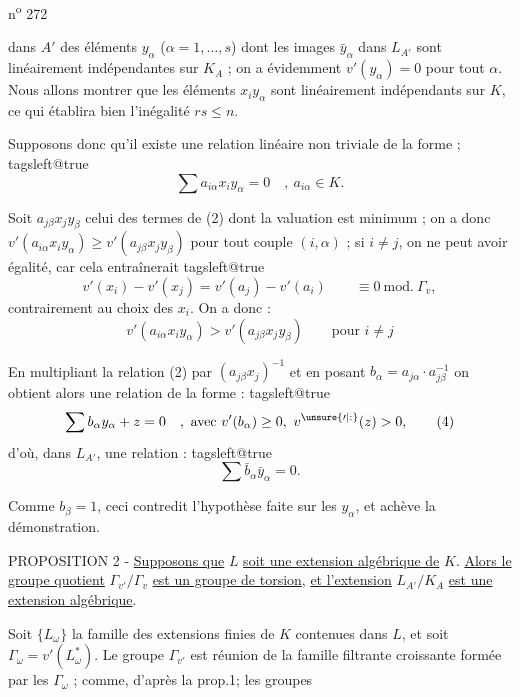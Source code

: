 n\textsuperscript{o} 272

dans $A'$ des éléments $y_\alpha$ ($\alpha=1,\ldots,s$) dont les images $\bar y_\alpha$ dans $L_{A'}$ sont linéairement indépendantes sur $K_A$ ; on a évidemment $v'(y_\alpha)=0$ pour tout $\alpha$. Nous allons montrer que les éléments $x_i y_\alpha$ sont linéairement indépendants sur $K$, ce qui établira bien l'inégalité $rs\leq n$.

Supposons donc qu'il existe une relation linéaire non triviale de la forme ;
\begingroup\csname tagsleft@true\endcsname
\[
\sum a_{i\alpha}x_i y_\alpha=0\quad,\ a_{i\alpha}\in K. \tag*{(2)}
\]
\endgroup

Soit $a_{j\beta}x_j y_\beta$ celui des termes de (2) dont la valuation est minimum ; on a donc $v'(a_{i\alpha}x_i y_\alpha)\geq v'(a_{j\beta}x_j y_\beta)$ pour tout couple $(i,\alpha)$ ; si $i\ne j$, on ne peut avoir égalité, car cela entraînerait
\begingroup\csname tagsleft@true\endcsname
\[
v'(x_i)-v'(x_j)=v'(a_j)-v'(a_i)\qquad\equiv 0\ \mathrm{mod.}\ \Gamma_v, \tag*{(3)}
\]
\endgroup
contrairement au choix des $x_i$. On a donc :
\[
v'(a_{i\alpha}x_i y_\alpha)>v'(a_{j\beta}x_j y_\beta)\qquad\text{pour } i\ne j
\]

En multipliant la relation (2) par $(a_{j\beta}x_j)^{-1}$ et en posant $b_\alpha=a_{j\alpha}\cdot a_{j\beta}^{-1}$ on obtient alors une relation de la forme :
\begingroup\csname tagsleft@true\endcsname
\[
\sum b_\alpha y_\alpha+z=0\quad,\ \text{avec }v'(b_\alpha)\geq 0,\ v^{\unsure{\prime|:}}(z)>0, \tag*{(4)}
\]
\endgroup
d'où, dans $L_{A'}$, une relation :
\begingroup\csname tagsleft@true\endcsname
\[
\sum\bar b_\alpha\bar y_\alpha=0. \tag*{(5)}
\]
\endgroup

Comme $b_\beta=1$, ceci contredit l'hypothèse faite sur les $y_\alpha$, et achève la démonstration.

PROPOSITION 2 - \uline{Supposons que} $L$ \uline{soit une extension algébrique de} $K$. \uline{Alors le groupe quotient} $\Gamma_{v'}/\Gamma_v$ \uline{est un groupe de torsion}, \uline{et l'extension} $L_{A'}/K_A$ \uline{est une extension algébrique}.

Soit $\{L_\omega\}$ la famille des extensions finies de $K$ contenues dans $L$, et soit $\Gamma_\omega=v'(L_\omega^*)$. Le groupe $\Gamma_{v'}$ est réunion de la famille filtrante croissante formée par les $\Gamma_\omega$ ; comme, d'après la prop.1; les groupes
